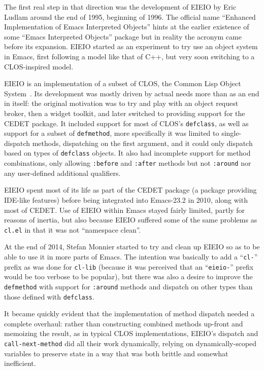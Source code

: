 \documentclass[format=acmsmall, review]{acmart}
\begin{document}
The first real step in that direction was the development of EIEIO by Eric
Ludlam around the end of 1995, beginning of 1996.  The official name ``Enhanced
Implementation of Emacs Interpreted Objects'' hints at the earlier existence
of some ``Emacs Interpreted Objects'' package but in reality the acronym
came before its expansion.  EIEIO started as an experiment to try use
an object system in Emacs, first following a model like that of C++, but
very soon switching to a CLOS-inspired model.

EIEIO is an implementation of a subset of CLOS, the Common Lisp Object
System~\cite{DeMichielGabriel1987}.  Its development was mostly
driven by actual needs more than as an end in itself: the original
motivation was to try and play with an object request broker, then a widget
toolkit, and later switched to providing support for the CEDET package.
It included support for most of CLOS's \texttt{defclass}, as well as support
for a subset of \texttt{defmethod}, more specifically it was limited to
single-dispatch methods, dispatching on the first argument, and it could
only dispatch based on types of \texttt{defclass} objects.  It also had
incomplete support for method combinations, only allowing \texttt{:before}
and \texttt{:after} methods but not \texttt{:around} nor any user-defined
additional qualifiers.

EIEIO spent most of its life as part of the CEDET package (a package
providing IDE-like features) before being integrated into Emacs-23.2 in
2010, along with most of CEDET.  Use of EIEIO within Emacs stayed fairly
limited, partly for reasons of inertia, but also because EIEIO suffered some
of the same problems as \texttt{cl.el} in that it was not
``namespace clean''.

At the end of 2014, Stefan Monnier started to try and clean up EIEIO so as
to be able to use it in more parts of Emacs.  The intention was basically to
add a ``\texttt{cl-}'' prefix as was done for \texttt{cl-lib} (because it
was perceived that an ``\texttt{eieio-}'' prefix would be too verbose to be
popular), but there was also a desire to improve the \texttt{defmethod} with
support for \texttt{:around} methods and dispatch on other types than those
defined with \texttt{defclass}.

It became quickly evident that the implementation of method dispatch
needed a complete overhaul: rather than constructing combined methods
up-front and memoizing the result, as in typical CLOS implementations,
EIEIO's dispatch and \texttt{call-next-method} did all their work
dynamically, relying on dynamically-scoped variables to preserve state in
a way that was both brittle and somewhat inefficient.
\end{document}
